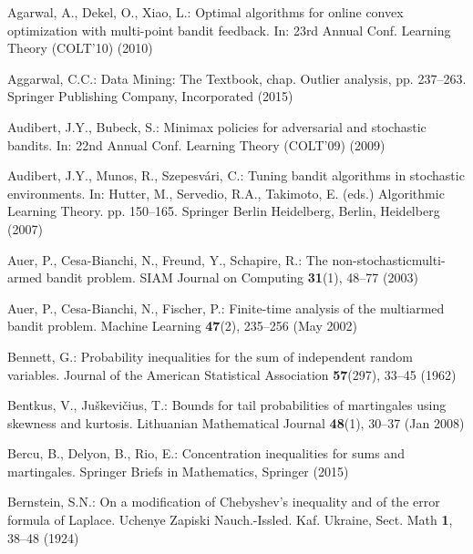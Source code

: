 \documentclass[runningheads, envcountsame, a4paper]{llncs}
\begin{document}
\begin{thebibliography}{10}
\providecommand{\url}[1]{\texttt{#1}}
\providecommand{\urlprefix}{URL }
\providecommand{\doi}[1]{https://doi.org/#1}

Agarwal, A., Dekel, O., Xiao, L.: Optimal algorithms for online convex
  optimization with multi-point bandit feedback. In: 23rd Annual Conf. Learning
  Theory (COLT'10) (2010)

Aggarwal, C.C.: Data Mining: The Textbook, chap. Outlier analysis, pp.
  237--263. Springer Publishing Company, Incorporated (2015)

Audibert, J.Y., Bubeck, S.: Minimax policies for adversarial and stochastic
  bandits. In: 22nd Annual Conf. Learning Theory (COLT'09) (2009)

Audibert, J.Y., Munos, R., Szepesv{\'a}ri, C.: Tuning bandit algorithms in
  stochastic environments. In: Hutter, M., Servedio, R.A., Takimoto, E. (eds.)
  Algorithmic Learning Theory. pp. 150--165. Springer Berlin Heidelberg,
  Berlin, Heidelberg (2007)

Auer, P., Cesa-{B}ianchi, N., Freund, Y., Schapire, R.: The
  non-stochasticmulti-armed bandit problem. SIAM Journal on Computing
  \textbf{31}(1),  48--77 (2003)

Auer, P., Cesa-Bianchi, N., Fischer, P.: Finite-time analysis of the multiarmed
  bandit problem. Machine Learning  \textbf{47}(2),  235--256 (May 2002)

Bennett, G.: Probability inequalities for the sum of independent random
  variables. Journal of the American Statistical Association  \textbf{57}(297),
   33--45 (1962)

Bentkus, V., Ju\v{s}kevi\v{c}ius, T.: Bounds for tail probabilities of
  martingales using skewness and kurtosis. Lithuanian Mathematical Journal
  \textbf{48}(1),  30--37 (Jan 2008)

Bercu, B., Delyon, B., Rio, E.: Concentration inequalities for sums and
  martingales. Springer Briefs in Mathematics, Springer (2015)

Bernstein, S.N.: On a modification of {C}hebyshev’s inequality and of the
  error formula of {L}aplace. Uchenye Zapiski Nauch.-Issled. Kaf. Ukraine,
  Sect. Math  \textbf{1},  38--48 (1924)


\end{thebibliography}
\end{document}
